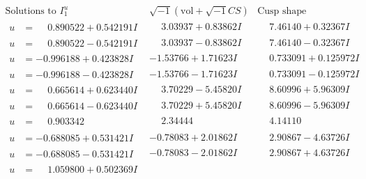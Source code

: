 \documentclass[1p]{elsarticle_modified}
\theoremstyle{definition}
\newcommand{\I}{\sqrt{-1}}
\begin{document}
$$\begin{array}{c|c|c}  
\text{Solutions to }I^u_{1}& \I (\text{vol} + \sqrt{-1}CS) & \text{Cusp shape}\\
 \hline 
\begin{aligned}
u &= \phantom{-}0.890522 + 0.542191 I\end{aligned}
 & \phantom{-}3.03937 + 0.83862 I & \phantom{-}7.46140 + 0.32367 I \\ \hline\begin{aligned}
u &= \phantom{-}0.890522 - 0.542191 I\end{aligned}
 & \phantom{-}3.03937 - 0.83862 I & \phantom{-}7.46140 - 0.32367 I \\ \hline\begin{aligned}
u &= -0.996188 + 0.423828 I\end{aligned}
 & -1.53766 + 1.71623 I & \phantom{-}0.733091 + 0.125972 I \\ \hline\begin{aligned}
u &= -0.996188 - 0.423828 I\end{aligned}
 & -1.53766 - 1.71623 I & \phantom{-}0.733091 - 0.125972 I \\ \hline\begin{aligned}
u &= \phantom{-}0.665614 + 0.623440 I\end{aligned}
 & \phantom{-}3.70229 - 5.45820 I & \phantom{-}8.60996 + 5.96309 I \\ \hline\begin{aligned}
u &= \phantom{-}0.665614 - 0.623440 I\end{aligned}
 & \phantom{-}3.70229 + 5.45820 I & \phantom{-}8.60996 - 5.96309 I \\ \hline\begin{aligned}
u &= \phantom{-}0.903342\phantom{ +0.000000I}\end{aligned}
 & \phantom{-}2.34444\phantom{ +0.000000I} & \phantom{-}4.14110\phantom{ +0.000000I} \\ \hline\begin{aligned}
u &= -0.688085 + 0.531421 I\end{aligned}
 & -0.78083 + 2.01862 I & \phantom{-}2.90867 - 4.63726 I \\ \hline\begin{aligned}
u &= -0.688085 - 0.531421 I\end{aligned}
 & -0.78083 - 2.01862 I & \phantom{-}2.90867 + 4.63726 I \\ \hline\begin{aligned}
u &= \phantom{-}1.059800 + 0.502369 I\end{aligned}

\end{array}$$
\end{document}
